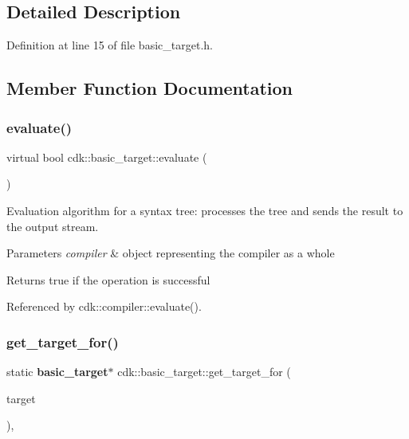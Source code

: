 \subsection{Detailed Description}


Definition at line 15 of file basic\+\_\+target.\+h.



\subsection{Member Function Documentation}
\mbox{\label{classcdk_1_1basic__target_a0db773c9c4f84a36df0949187aab9adb}} 
\subsubsection{evaluate()}
{\footnotesize\ttfamily virtual bool cdk\+::basic\+\_\+target\+::evaluate (\begin{DoxyParamCaption}\item[{std\+::shared\+\_\+ptr$<$ \textbf{ compiler} $>$}]{ }\end{DoxyParamCaption})\hspace{0.3cm}{\ttfamily [pure virtual]}}

Evaluation algorithm for a syntax tree\+: processes the tree and sends the result to the output stream. 
\begin{DoxyParams}{Parameters}
{\em compiler} & object representing the compiler as a whole \\
\hline
\end{DoxyParams}
\begin{DoxyReturn}{Returns}
true if the operation is successful 
\end{DoxyReturn}


Referenced by cdk\+::compiler\+::evaluate().

\mbox{\label{classcdk_1_1basic__target_a50126c8601a5b82dcce46e43d4258064}} 
\subsubsection{get\+\_\+target\+\_\+for()}
{\footnotesize\ttfamily static \textbf{ basic\+\_\+target}$\ast$ cdk\+::basic\+\_\+target\+::get\+\_\+target\+\_\+for (\begin{DoxyParamCaption}\item[{const std\+::string \&}]{target }\end{DoxyParamCaption})\hspace{0.3cm}{\ttfamily [inline]}, {\ttfamily [static]}}

